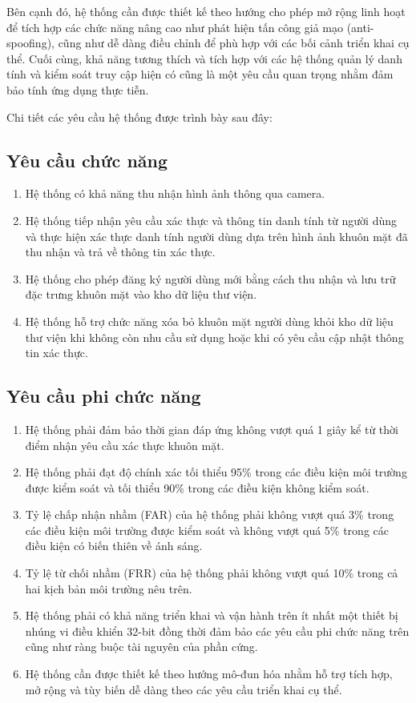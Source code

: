 Bên cạnh đó, hệ thống cần được thiết kế theo hướng cho phép mở rộng linh hoạt để tích hợp các chức năng nâng cao như phát hiện tấn công giả mạo (anti-spoofing), cũng như dễ dàng điều chỉnh để phù hợp với các bối cảnh triển khai cụ thể. Cuối cùng, khả năng tương thích và tích hợp với các hệ thống quản lý danh tính và kiểm soát truy cập hiện có cũng là một yêu cầu quan trọng nhằm đảm bảo tính ứng dụng thực tiễn. 

Chi tiết các yêu cầu hệ thống được trình bày sau đây:
\subsection{Yêu cầu chức năng}
\begin{enumerate}
    \item Hệ thống có khả năng thu nhận hình ảnh thông qua camera.
    \item Hệ thống tiếp nhận yêu cầu xác thực và thông tin danh tính từ người dùng và thực hiện xác thực danh tính người dùng dựa trên hình ảnh khuôn mặt đã thu nhận và trả về thông tin xác thực.
    \item Hệ thống cho phép đăng ký người dùng mới bằng cách thu nhận và lưu trữ đặc trưng khuôn mặt vào kho dữ liệu thư viện.
    \item Hệ thống hỗ trợ chức năng xóa bỏ khuôn mặt người dùng khỏi kho dữ liệu thư viện khi không còn nhu cầu sử dụng hoặc khi có yêu cầu cập nhật thông tin xác thực.
\end{enumerate}

\subsection{Yêu cầu phi chức năng}
\begin{enumerate}
    \item Hệ thống phải đảm bảo thời gian đáp ứng không vượt quá 1 giây kể từ thời điểm nhận yêu cầu xác thực khuôn mặt.
    \item Hệ thống phải đạt độ chính xác tối thiểu 95\% trong các điều kiện môi trường được kiểm soát và tối thiểu 90\% trong các điều kiện không kiểm soát.
    \item Tỷ lệ chấp nhận nhầm (FAR) của hệ thống phải không vượt quá 3\% trong các điều kiện môi trường được kiểm soát và không vượt quá 5\% trong các điều kiện có biến thiên về ánh sáng.
    \item Tỷ lệ từ chối nhầm (FRR) của hệ thống phải không vượt quá 10\% trong cả hai kịch bản môi trường nêu trên.
    \item Hệ thống phải có khả năng triển khai và vận hành trên ít nhất một thiết bị nhúng vi điều khiển 32-bit đồng thời đảm bảo các yêu cầu phi chức năng trên cũng như ràng buộc tài nguyên của phần cứng.
    \item Hệ thống cần được thiết kế theo hướng mô-đun hóa nhằm hỗ trợ tích hợp, mở rộng và tùy biến dễ dàng theo các yêu cầu triển khai cụ thể.
\end{enumerate}

